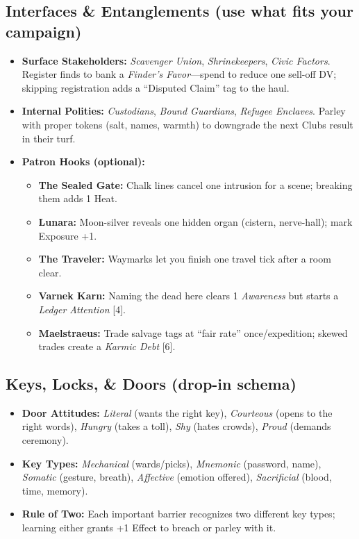 \subsection*{Interfaces \& Entanglements (use what fits your campaign)}
\begin{itemize}
  \item \textbf{Surface Stakeholders:} \emph{Scavenger Union}, \emph{Shrinekeepers}, \emph{Civic Factors}. Register finds to bank a \emph{Finder’s Favor}—spend to reduce one sell-off DV; skipping registration adds a “Disputed Claim” tag to the haul.
  \item \textbf{Internal Polities:} \emph{Custodians}, \emph{Bound Guardians}, \emph{Refugee Enclaves}. Parley with proper tokens (salt, names, warmth) to downgrade the next Clubs result in their turf.
  \item \textbf{Patron Hooks (optional):}
    \begin{itemize}
      \item \textbf{The Sealed Gate:} Chalk lines cancel one intrusion for a scene; breaking them adds 1 Heat.
      \item \textbf{Lunara:} Moon-silver reveals one hidden organ (cistern, nerve-hall); mark Exposure +1.
      \item \textbf{The Traveler:} Waymarks let you finish one travel tick after a room clear.
      \item \textbf{Varnek Karn:} Naming the dead here clears 1 \emph{Awareness} but starts a \emph{Ledger Attention} [4].
      \item \textbf{Maelstraeus:} Trade salvage tags at “fair rate” once/expedition; skewed trades create a \emph{Karmic Debt} [6].
    \end{itemize}
\end{itemize}

\subsection*{Keys, Locks, \& Doors (drop-in schema)}
\begin{itemize}
  \item \textbf{Door Attitudes:} \emph{Literal} (wants the right key), \emph{Courteous} (opens to the right words), \emph{Hungry} (takes a toll), \emph{Shy} (hates crowds), \emph{Proud} (demands ceremony).
  \item \textbf{Key Types:} \emph{Mechanical} (wards/picks), \emph{Mnemonic} (password, name), \emph{Somatic} (gesture, breath), \emph{Affective} (emotion offered), \emph{Sacrificial} (blood, time, memory).
  \item \textbf{Rule of Two:} Each important barrier recognizes two different key types; learning either grants +1 Effect to breach or parley with it.
\end{itemize}


